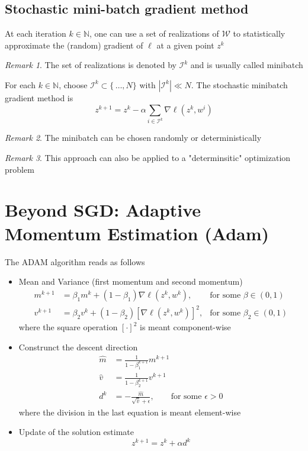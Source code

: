 \documentclass{book}
\newcommand{\N}{\mathbb{N}}
\theoremstyle{theoremv2}
\theoremstyle{defv2}
\theoremstyle{remark}
\newtheorem*{remark}{Remark}
\theoremstyle{remark}
\theoremstyle{definition}
\theoremstyle{definition}
\begin{document}
\subsection{Stochastic mini-batch gradient method}
At each iteration $k\in\N$, one can use a set of realizations of $\mathcal{W}$ to statistically approximate the (random) gradient of $\ell$ at a given point $z^k$
\begin{remark}
    The set of realizations is denoted by $\mathcal{I}^k$ and is usually called minibatch
\end{remark}
For each $k\in\N$, choose $\mathcal{I}^k\subset \{\,\dots,N\}$ with $|\mathcal{I}^k| \ll N$. The stochastic minibatch gradient method is 
\[
    z^{k+1} = z^k - \alpha \displaystyle\sum_{i\in\mathcal{I}^k}\nabla \ell (z^k,w^i)
\]
\begin{remark}
    The minibatch can be chosen randomly or deterministically
\end{remark}
\begin{remark}
    This approach can also be applied to a "determinsitic" optimization problem
\end{remark}
\section{Beyond SGD: Adaptive Momentum Estimation (Adam)}
The ADAM algorithm reads as follows
\begin{itemize}
    \item Mean and Variance (first momentum and second momentum)
        \begin{align*}
            m^{k+1} & = \beta_1m^k+(1-\beta_1)\nabla\ell(z^k,w^k), &\text{for some } \beta\in(0,1)\\
            v^{k+1} & = \beta_2v^k+(1-\beta_2)[\nabla\ell(z^k,w^k)]^2, &\text{for some } \beta_2\in(0,1)
        \end{align*}
        where the square operation $[\cdot]^2$ is meant component-wise
    \item Construnct the descent direction
        \begin{align*}
            \hat{m} &= \displaystyle\frac{1}{1-\beta_1^{k+1}}m^{k+1}\\
            \hat{v} &= \displaystyle\frac{1}{1-\beta_2^{k+1}}v^{k+1}\\
            d^k &= -\displaystyle\frac{\hat{m}}{\sqrt{\hat{v}}+\epsilon}, \qquad \text{for some } \epsilon> 0
        \end{align*}
        where the division in the last equation is meant element-wise
    \item Update of the solution estimate 
        \[
            z^{k+1} = z^k + \alpha d^k
        \]
\end{itemize}
\end{document}
